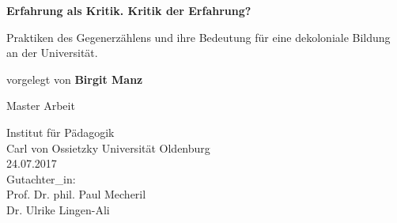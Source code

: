 \documentclass[11pt]{article}
\begin{document}
\onehalfspacing
\setlength{\epigraphwidth}{0.7\textwidth}
\begin{titlepage}
    \begin{center}
        \vspace*{1cm}
        
        \huge
        \textbf{Erfahrung als Kritik. Kritik der Erfahrung?}
        
        \vspace{0.5cm}
        \LARGE
Praktiken des Gegenerzählens und ihre Bedeutung für eine dekoloniale Bildung an der Universität.
        
        \vspace{1.5cm}
        
        vorgelegt von \textbf{Birgit Manz}
        
        \vfill
       
        Master Arbeit
                
        \vspace{0.8cm}
     
        
        \Large
        Institut für Pädagogik\\
        Carl von Ossietzky Universität Oldenburg\\
        24.07.2017\\
        \vspace{1.5cm} 
        Gutachter\_in: \\[0.75em]
          Prof. Dr. phil. Paul Mecheril
          \\[0.2em]
          Dr. Ulrike Lingen-Ali

        \end{center}

\end{titlepage}




%
%

%
%
%
%
%
%
%
%

\end{document}
